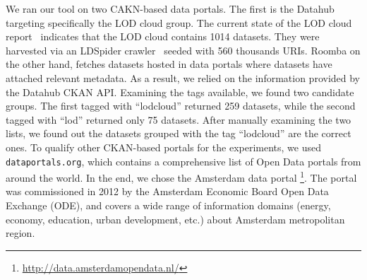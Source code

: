 \documentclass[runningheads,a4paper]{llncs}
\begin{document}
We ran our tool on two CAKN-based data portals. The first is the Datahub targeting specifically the LOD cloud group. The current state of the LOD cloud report~\cite{DBLP:conf/semweb/SchmachtenbergBP14} indicates that the LOD cloud contains 1014 datasets. They were harvested via an LDSpider crawler~\cite{conf/semweb/IseleUBH10} seeded with 560 thousands URIs. Roomba on the other hand, fetches datasets hosted in data portals where datasets have attached relevant metadata. As a result, we relied on the information provided by the Datahub CKAN API. Examining the tags available, we found two candidate groups. The first tagged with ``lodcloud'' returned 259 datasets, while the second tagged with ``lod'' returned only 75 datasets. After manually examining the two lists, we found out the datasets grouped with the tag ``lodcloud'' are the correct ones. To qualify other CKAN-based portals for the experiments, we used \texttt{dataportals.org}, which contains a comprehensive list of Open Data portals from around the world. In the end, we chose the Amsterdam data portal \footnote{\url{http://data.amsterdamopendata.nl/}}. The portal was commissioned in 2012 by the Amsterdam Economic Board Open Data Exchange (ODE), and covers a wide range of information domains (energy, economy, education, urban development, etc.) about Amsterdam metropolitan region.
\end{document}

